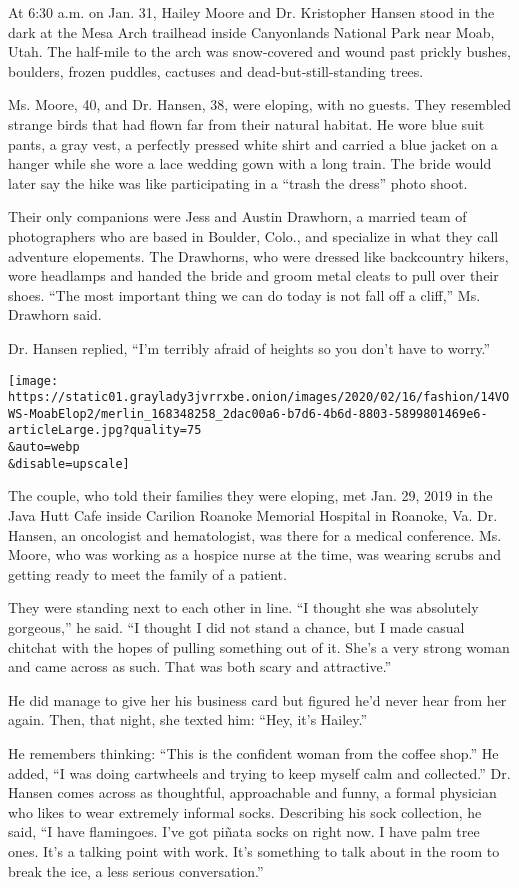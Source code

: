 At 6:30 a.m. on Jan. 31, Hailey Moore and Dr. Kristopher Hansen stood in
the dark at the Mesa Arch trailhead inside Canyonlands National Park
near Moab, Utah. The half-mile to the arch was snow-covered and wound
past prickly bushes, boulders, frozen puddles, cactuses and
dead-but-still-standing trees.

Ms. Moore, 40, and Dr. Hansen, 38, were eloping, with no guests. They
resembled strange birds that had flown far from their natural habitat.
He wore blue suit pants, a gray vest, a perfectly pressed white shirt
and carried a blue jacket on a hanger while she wore a lace wedding gown
with a long train. The bride would later say the hike was like
participating in a ``trash the dress'' photo shoot.

Their only companions were Jess and Austin Drawhorn, a married team of
photographers who are based in Boulder, Colo., and specialize in what
they call adventure elopements. The Drawhorns, who were dressed like
backcountry hikers, wore headlamps and handed the bride and groom metal
cleats to pull over their shoes. ``The most important thing we can do
today is not fall off a cliff,'' Ms. Drawhorn said.

Dr. Hansen replied, ``I'm terribly afraid of heights so you don't have
to worry.''

\texttt{[image: https://static01.graylady3jvrrxbe.onion/images/2020/02/16/fashion/14VOWS-MoabElop2/merlin\_168348258\_2dac00a6-b7d6-4b6d-8803-5899801469e6-articleLarge.jpg?quality=75\\\&auto=webp\\\&disable=upscale]}

The couple, who told their families they were eloping, met Jan. 29, 2019
in the Java Hutt Cafe inside Carilion Roanoke Memorial Hospital in
Roanoke, Va. Dr. Hansen, an oncologist and hematologist, was there for a
medical conference. Ms. Moore, who was working as a hospice nurse at the
time, was wearing scrubs and getting ready to meet the family of a
patient.

They were standing next to each other in line. ``I thought she was
absolutely gorgeous,'' he said. ``I thought I did not stand a chance,
but I made casual chitchat with the hopes of pulling something out of
it. She's a very strong woman and came across as such. That was both
scary and attractive.''

He did manage to give her his business card but figured he'd never hear
from her again. Then, that night, she texted him: ``Hey, it's Hailey.''

He remembers thinking: ``This is the confident woman from the coffee
shop.'' He added, ``I was doing cartwheels and trying to keep myself
calm and collected.'' Dr. Hansen comes across as thoughtful,
approachable and funny, a formal physician who likes to wear extremely
informal socks. Describing his sock collection, he said, ``I have
flamingoes. I've got piñata socks on right now. I have palm tree ones.
It's a talking point with work. It's something to talk about in the room
to break the ice, a less serious conversation.''

